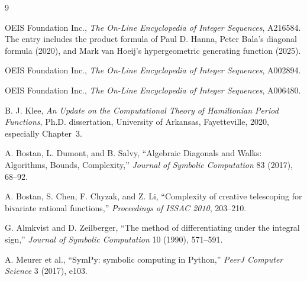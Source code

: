 \documentclass[11pt,fleqn]{article}
\theoremstyle{plain}
\begin{document}
\begin{thebibliography}{9}

OEIS Foundation Inc., \emph{The On-Line Encyclopedia of Integer Sequences},
A216584.  The entry includes the product formula of Paul D. Hanna, Peter
Bala's diagonal formula (2020), and Mark van Hoeij's hypergeometric generating
function (2025).

OEIS Foundation Inc., \emph{The On-Line Encyclopedia of Integer Sequences},
A002894.

OEIS Foundation Inc., \emph{The On-Line Encyclopedia of Integer Sequences},
A006480.

B. J. Klee,
\emph{An Update on the Computational Theory of Hamiltonian Period Functions},
Ph.D. dissertation, University of Arkansas, Fayetteville, 2020, especially
Chapter~3.

A. Bostan, L. Dumont, and B. Salvy,
``Algebraic Diagonals and Walks: Algorithms, Bounds, Complexity,''
\emph{Journal of Symbolic Computation} 83 (2017), 68--92.

A. Bostan, S. Chen, F. Chyzak, and Z. Li,
``Complexity of creative telescoping for bivariate rational functions,''
\emph{Proceedings of ISSAC 2010}, 203--210.

G. Almkvist and D. Zeilberger,
``The method of differentiating under the integral sign,''
\emph{Journal of Symbolic Computation} 10 (1990), 571--591.

A. Meurer et al.,
``SymPy: symbolic computing in Python,''
\emph{PeerJ Computer Science} 3 (2017), e103.

\end{thebibliography}
\end{document}
